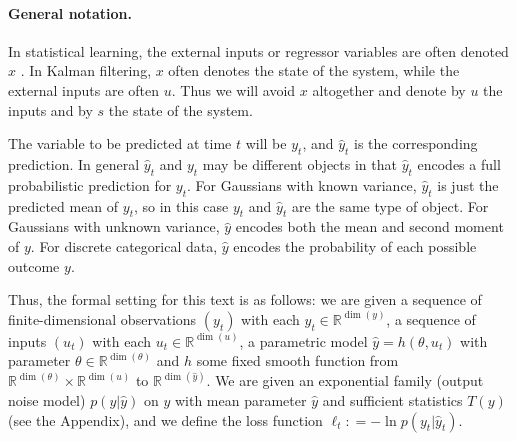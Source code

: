 \documentclass[11pt,a4paper]{article}
\def\R{{\mathbb{R}}}
\newcommand{\deq}{\mathrel{\mathop{:}}=}
\newcommand{\1}{\mathbbm{1}}
\theoremstyle{yannthm}
\theoremstyle{yannthm2}
\numberwithin{equation}{section}
\begin{document}
% 



\paragraph*{General notation.} In
statistical learning, the external inputs or regressor variables are often
denoted $x$%
. In Kalman filtering, $x$ often denotes the state of
the system, while the external inputs are often $u$. Thus %
we will avoid $x$ altogether and denote by $u$ the inputs and
by $s$ the state of
the system.

The variable to be predicted at time $t$ will be $y_t$, and $\hat y_t$ is
the corresponding prediction. In general $\hat y_t$ and $y_t$ may be
different objects in that $\hat y_t$ encodes a full probabilistic
prediction for $y_t$. For Gaussians with known variance, $\hat y_t$ is
just the predicted mean of $y_t$, so in this case $y_t$ and $\hat y_t$
are the same type of object.  For Gaussians with unknown variance, $\hat
y$ encodes both the mean and second moment of $y$. For discrete
categorical data, $\hat y$ encodes the probability of each possible
outcome $y$.

Thus, the formal setting for this text is as follows: we are given a
sequence of finite-dimensional observations $(y_t)$ with each $y_t\in
\R^{\dim(y)}$, a sequence of inputs $(u_t)$ with each $u_t\in
\R^{\dim(u)}$, a parametric model $\hat y=h(\theta,u_t)$ with parameter
$\theta\in \R^{\dim(\theta)}$ and $h$ some fixed smooth function from
$\R^{\dim(\theta)}\times \R^{\dim(u)}$ to $\R^{\dim(\hat y)}$. We are
given an exponential family (output noise model) $p(y|\hat y)$ on $y$
with mean parameter $\hat y$ and sufficient statistics $T(y)$ (see the
Appendix), and we define the loss function $\ell_t\deq -\ln p(y_t|\hat y_t)$.
\end{document}
